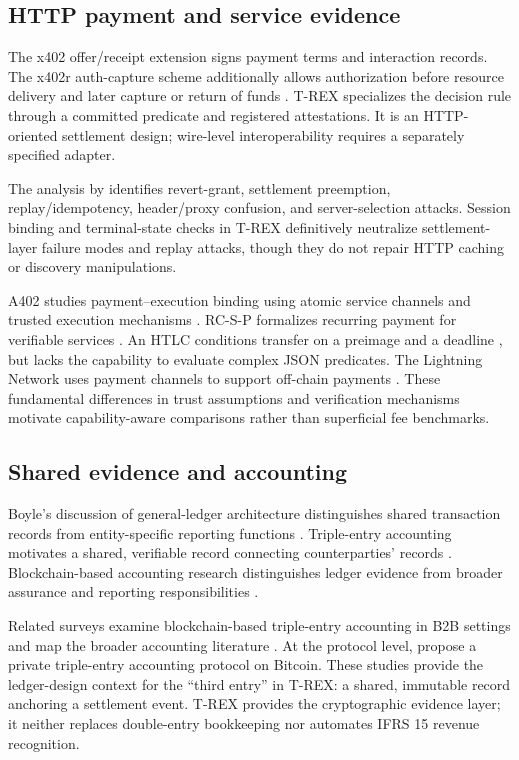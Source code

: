 \documentclass[fleqn,10pt,lineno]{wlpeerj}
\begin{document}
\subsection{HTTP payment and service evidence}

The x402 offer/receipt extension signs payment terms and interaction records. The x402r auth-capture scheme additionally allows authorization before resource delivery and later capture or return of funds \citep{x402_ext,X402EscrowSpec}. T-REX specializes the decision rule through a committed predicate and registered attestations. It is an HTTP-oriented settlement design; wire-level interoperability requires a separately specified adapter.

The analysis by \citet{li2026five} identifies revert-grant, settlement preemption, replay/idempotency, header/proxy confusion, and server-selection attacks. Session binding and terminal-state checks in T-REX definitively neutralize settlement-layer failure modes and replay attacks, though they do not repair HTTP caching or discovery manipulations. 

A402 studies payment--execution binding using atomic service channels and trusted execution mechanisms \citep{A402Li2026}. RC-S-P formalizes recurring payment for verifiable services \citep{rcsp}. An HTLC conditions transfer on a preimage and a deadline \citep{htlc}, but lacks the capability to evaluate complex JSON predicates. The Lightning Network uses payment channels to support off-chain payments \citep{LightningPoonDryja2016}. These fundamental differences in trust assumptions and verification mechanisms motivate capability-aware comparisons rather than superficial fee benchmarks.

\subsection{Shared evidence and accounting}

Boyle's discussion of general-ledger architecture distinguishes shared transaction records from entity-specific reporting functions \citep{boyle2001}. Triple-entry accounting motivates a shared, verifiable record connecting counterparties' records \citep{grigg2005,Cai2019,tea_slr1}. Blockchain-based accounting research distinguishes ledger evidence from broader assurance and reporting responsibilities \citep{DaiVasarhelyi2017}.

Related surveys examine blockchain-based triple-entry accounting in B2B settings \citep{tea_slr2} and map the broader accounting literature \citep{BlockchainAccountingReview2026}. At the protocol level, \citet{pan2023} propose a private triple-entry accounting protocol on Bitcoin. These studies provide the ledger-design context for the ``third entry'' in T-REX: a shared, immutable record anchoring a settlement event. T-REX provides the cryptographic evidence layer; it neither replaces double-entry bookkeeping nor automates IFRS 15 revenue recognition.
\end{document}
